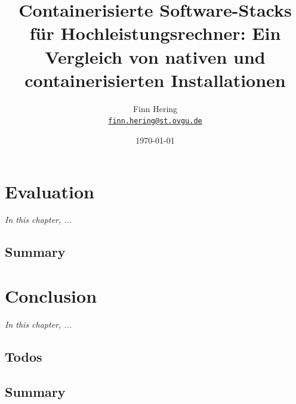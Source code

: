\documentclass[
  12pt,
  a4paper,
  printlength,
  bibliography=totoc,
  chapterprefix,
  headings=openright,
  numbers=endperiod,
  parskip=half,
  twoside
]{scrreprt}
\title{Containerisierte Software-Stacks für Hochleistungsrechner: Ein Vergleich von nativen und containerisierten Installationen}
\author{
  Finn Hering\\
  {\large\href{mailto:finn.hering@st.ovgu.de}{\nolinkurl{finn.hering@st.ovgu.de}}}
}
\date{\today}
\begin{document}
\sloppy

{}

\maketitle

\begin{abstract}
  \lipsum[1]

\end{abstract}

\tableofcontents




\ifdraft{\cleardoubleoddpage}{}











\chapter{Evaluation}

\textit{In this chapter, ...}

\section*{Summary}

\lipsum[2]

\chapter{Conclusion}
\label{cha:conclusion}

\textit{In this chapter, ...}

\section{Todos}


\lipsum[1-2]

\section*{Summary}
\end{document}
